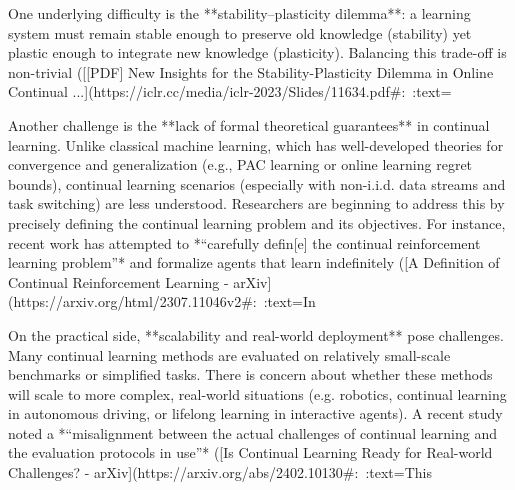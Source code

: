 One underlying difficulty is the **stability–plasticity dilemma**: a learning system must remain stable enough to preserve old knowledge (stability) yet plastic enough to integrate new knowledge (plasticity). Balancing this trade-off is non-trivial ([[PDF] New Insights for the Stability-Plasticity Dilemma in Online Continual ...](https://iclr.cc/media/iclr-2023/Slides/11634.pdf#:~:text=%

Another challenge is the **lack of formal theoretical guarantees** in continual learning. Unlike classical machine learning, which has well-developed theories for convergence and generalization (e.g., PAC learning or online learning regret bounds), continual learning scenarios (especially with non-i.i.d. data streams and task switching) are less understood. Researchers are beginning to address this by precisely defining the continual learning problem and its objectives. For instance, recent work has attempted to *“carefully defin[e] the continual reinforcement learning problem”* and formalize agents that learn indefinitely ([A Definition of Continual Reinforcement Learning - arXiv](https://arxiv.org/html/2307.11046v2#:~:text=In%

On the practical side, **scalability and real-world deployment** pose challenges. Many continual learning methods are evaluated on relatively small-scale benchmarks or simplified tasks. There is concern about whether these methods will scale to more complex, real-world situations (e.g. robotics, continual learning in autonomous driving, or lifelong learning in interactive agents). A recent study noted a *“misalignment between the actual challenges of continual learning and the evaluation protocols in use”* ([Is Continual Learning Ready for Real-world Challenges? - arXiv](https://arxiv.org/abs/2402.10130#:~:text=This%

